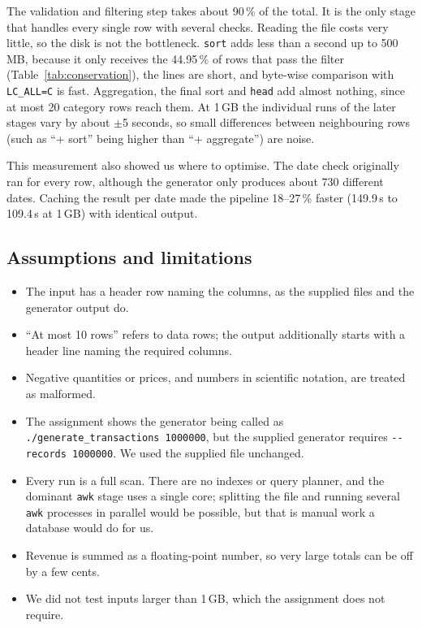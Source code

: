 \documentclass[11pt,a4paper]{article}
\newcommand{\file}[1]{\texttt{#1}}
\begin{document}
The validation and filtering step takes about 90\,\% of the total. It is the
only stage that handles every single row with several checks. Reading the file
costs very little, so the disk is not the bottleneck. \file{sort} adds less
than a second up to 500\,MB, because it only receives the 44.95\,\% of rows
that pass the filter (Table~\ref{tab:conservation}), the lines are short, and byte-wise comparison with
\file{LC\_ALL=C} is fast. Aggregation, the final sort and \file{head} add
almost nothing, since at most 20 category rows reach them. At 1\,GB the
individual runs of the later stages vary by about $\pm$5 seconds, so small
differences between neighbouring rows (such as ``+ sort'' being higher than
``+ aggregate'') are noise.

This measurement also showed us where to optimise. The date check originally
ran for every row, although the generator only produces about 730 different
dates. Caching the result per date made the pipeline 18--27\,\% faster
(149.9\,s to 109.4\,s at 1\,GB) with identical output.

\subsection{Assumptions and limitations}

\begin{itemize}
\item The input has a header row naming the columns, as the supplied files
and the generator output do.
\item ``At most 10 rows'' refers to data rows; the output additionally starts
with a header line naming the required columns.
\item Negative quantities or prices, and numbers in scientific notation, are
treated as malformed.
\item The assignment shows the generator being called as
\file{./generate\_transactions 1000000}, but the supplied generator requires
\file{-{}-records 1000000}. We used the supplied file unchanged.
\item Every run is a full scan. There are no indexes or query planner, and the
dominant \file{awk} stage uses a single core; splitting the file and running
several \file{awk} processes in parallel would be possible, but that is manual
work a database would do for us.
\item Revenue is summed as a floating-point number, so very large totals can
be off by a few cents.
\item We did not test inputs larger than 1\,GB, which the assignment does not
require.
\end{itemize}
\end{document}
